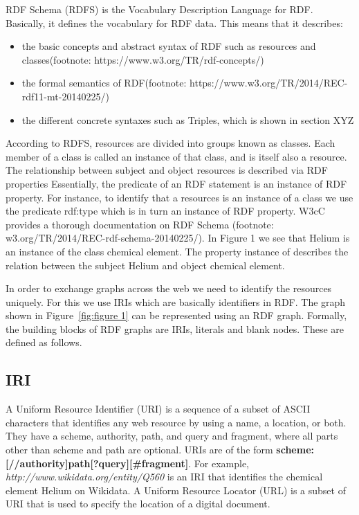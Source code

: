 RDF Schema (RDFS) is the Vocabulary Description Language for RDF. Basically, it defines the vocabulary for RDF data. This means that it describes:

\begin{itemize}
	\item the basic concepts and abstract syntax of RDF such as resources and classes(footnote: https://www.w3.org/TR/rdf-concepts/)
	\item the formal semantics of RDF(footnote: https://www.w3.org/TR/2014/REC-rdf11-mt-20140225/)
	\item the different concrete syntaxes such as Triples, which is shown in section XYZ
\end{itemize}

According to RDFS, resources are divided into groups known as classes. Each member of a class is called an instance of that class, and is itself also a resource. The relationship between subject and object resources is described via RDF properties Essentially, the predicate of an RDF statement is an instance of RDF property. For instance, to identify that a resources is an instance of a class we use the predicate rdf:type which is in turn an instance of RDF property. W3cC provides a thorough documentation on RDF Schema (footnote: w3.org/TR/2014/REC-rdf-schema-20140225/). In Figure 1 we see that Helium is an instance of the class chemical element. The property instance of describes the relation between the subject Helium and object chemical element.

In order to exchange graphs across the web we need to identify the resources uniquely. For this we use IRIs which are basically identifiers in RDF. The graph shown in Figure~\ref{fig:figure 1} can be represented using an RDF graph. Formally, the building blocks of RDF graphs are IRIs, literals and blank nodes. These are defined as follows.

\subsection*{IRI}
A Uniform Resource Identifier (\acrshort{URI}) is a sequence of a subset of ASCII characters that identifies any web resource by using a name, a location, or both. They have a scheme, authority, path, and query and fragment, where all parts other than scheme and path are optional. URIs are of the form \textbf{scheme:[//authority]path[?query][\#fragment]}. For example, \textit{http://www.wikidata.org/entity/Q560} is an IRI that identifies the chemical element Helium on Wikidata. A Uniform Resource Locator (\acrshort{URL}) is a subset of URI that is used to specify the location of a digital document.

